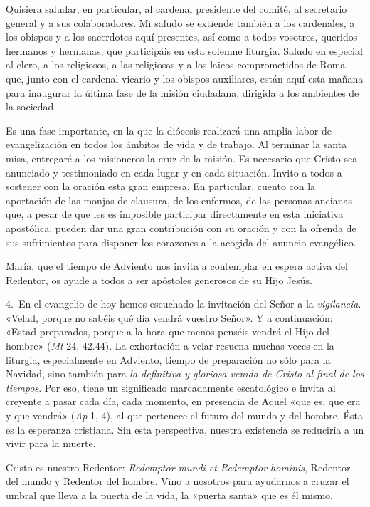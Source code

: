 Quisiera saludar, en particular, al cardenal presidente del comité, al
secretario general y a sus colaboradores. Mi saludo se extiende también
a los cardenales, a los obispos y a los sacerdotes aquí presentes, así
como a todos vosotros, queridos hermanos y hermanas, que participáis en
esta solemne liturgia. Saludo en especial al clero, a los religiosos, a
las religiosas y a los laicos comprometidos de Roma, que, junto con el
cardenal vicario y los obispos auxiliares, están aquí esta mañana para
inaugurar la última fase de la misión ciudadana, dirigida a los
ambientes de la sociedad.

Es una fase importante, en la que la diócesis realizará una amplia labor
de evangelización en todos los ámbitos de vida y de trabajo. Al terminar
la santa misa, entregaré a los misioneros la cruz de la misión. Es
necesario que Cristo sea anunciado y testimoniado en cada lugar y en
cada situación. Invito a todos a sostener con la oración esta gran
empresa. En particular, cuento con la aportación de las monjas de
clausura, de los enfermos, de las personas ancianas que, a pesar de que
les es imposible participar directamente en esta iniciativa apostólica,
pueden dar una gran contribución con su oración y con la ofrenda de sus
sufrimientos para disponer los corazones a la acogida del anuncio
evangélico.

María, que el tiempo de Adviento nos invita a contemplar en espera
activa del Redentor, os ayude a todos a ser apóstoles generosos de su
Hijo Jesús.

4.~En el evangelio de hoy hemos escuchado la invitación del Señor a la
\emph{vigilancia}. «Velad, porque no sabéis qué día vendrá vuestro
Señor». Y a continuación: «Estad preparados, porque a la hora que menos
penséis vendrá el Hijo del hombre» (\emph{Mt} 24, 42.44). La exhortación
a velar resuena muchas veces en la liturgia, especialmente en Adviento,
tiempo de preparación no sólo para la Navidad, sino también para
\emph{la definitiva y gloriosa venida de Cristo al final de los
	tiempos}. Por eso, tiene un significado marcadamente escatológico e
invita al creyente a pasar cada día, cada momento, en presencia de Aquel
«que es, que era y que vendrá» (\emph{Ap} 1, 4), al que pertenece el
futuro del mundo y del hombre. Ésta es la esperanza cristiana. Sin esta
perspectiva, nuestra existencia se reduciría a un vivir para la muerte.

Cristo es nuestro Redentor: \emph{Redemptor mundi et Redemptor hominis},
Redentor del mundo y Redentor del hombre. Vino a nosotros para ayudarnos
a cruzar el umbral que lleva a la puerta de la vida, la «puerta santa»
que es él mismo.

